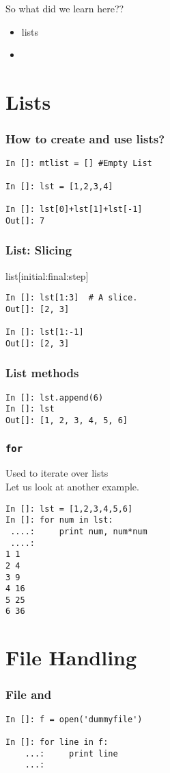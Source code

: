 \documentclass[14pt,compress]{beamer}
\newcounter{time}
\newcommand{\inctime}[1]{\addtocounter{time}{#1}{\tiny \thetime\ m}}
\newcommand{\kwrd}[1]{ \texttt{\textbf{\color{blue}{#1}}}  }
\begin{document}
\begin{frame}{So what did we learn here??}
  \begin{itemize}
    \item lists
    \item \alert{\kwrd{for}}
  \end{itemize}
\end{frame}

\section{Lists}
\begin{frame}[fragile]
  \frametitle{How to create and use lists?}
\begin{lstlisting}
In []: mtlist = [] #Empty List

In []: lst = [1,2,3,4] 

In []: lst[0]+lst[1]+lst[-1]
Out[]: 7
\end{lstlisting}
\end{frame}

\begin{frame}[fragile]
  \frametitle{List: Slicing}
list[initial:final:step]
\begin{lstlisting}
In []: lst[1:3]  # A slice.
Out[]: [2, 3]

In []: lst[1:-1]
Out[]: [2, 3]
\end{lstlisting}
\end{frame}

\begin{frame}[fragile]
  \frametitle{List methods}
\begin{lstlisting}
In []: lst.append(6)
In []: lst
Out[]: [1, 2, 3, 4, 5, 6]
\end{lstlisting}
\end{frame}

\begin{frame}[fragile]
\frametitle{\texttt{for}}
Used to iterate over lists\\ Let us look at another example.
\begin{lstlisting}
In []: lst = [1,2,3,4,5,6]
In []: for num in lst:
 ....:     print num, num*num
 ....:    
1 1
2 4
3 9
4 16
5 25
6 36
\end{lstlisting}
\end{frame}

\section{File Handling}
\begin{frame}[fragile]
    \frametitle{File and \kwrd{for}}
\begin{lstlisting}
In []: f = open('dummyfile')

In []: for line in f:
    ...:     print line
    ...:  
\end{lstlisting}
\inctime{5}
\end{frame}
\end{document}
